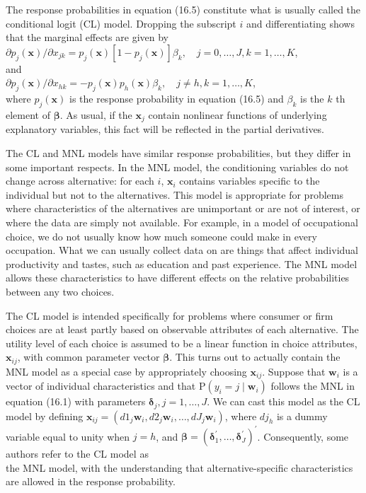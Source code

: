 \documentclass[10pt]{article}
\begin{document}
The response probabilities in equation (16.5) constitute what is usually called the conditional logit (CL) model. Dropping the subscript $i$ and differentiating shows that the marginal effects are given by\\
$\partial p_{j}(\mathbf{x}) / \partial x_{j k}=p_{j}(\mathbf{x})\left[1-p_{j}(\mathbf{x})\right] \beta_{k}, \quad j=0, \ldots, J, k=1, \ldots, K$,\\
and\\
$\partial p_{j}(\mathbf{x}) / \partial x_{h k}=-p_{j}(\mathbf{x}) p_{h}(\mathbf{x}) \beta_{k}, \quad j \neq h, k=1, \ldots, K$,\\
where $p_{j}(\mathbf{x})$ is the response probability in equation (16.5) and $\beta_{k}$ is the $k$ th element of $\boldsymbol{\beta}$. As usual, if the $\mathbf{x}_{j}$ contain nonlinear functions of underlying explanatory variables, this fact will be reflected in the partial derivatives.

The CL and MNL models have similar response probabilities, but they differ in some important respects. In the MNL model, the conditioning variables do not change across alternative: for each $i$, $\mathbf{x}_{i}$ contains variables specific to the individual but not to the alternatives. This model is appropriate for problems where characteristics of the alternatives are unimportant or are not of interest, or where the data are simply not available. For example, in a model of occupational choice, we do not usually know how much someone could make in every occupation. What we can usually collect data on are things that affect individual productivity and tastes, such as education and past experience. The MNL model allows these characteristics to have different effects on the relative probabilities between any two choices.

The CL model is intended specifically for problems where consumer or firm choices are at least partly based on observable attributes of each alternative. The utility level of each choice is assumed to be a linear function in choice attributes, $\mathbf{x}_{i j}$, with common parameter vector $\boldsymbol{\beta}$. This turns out to actually contain the MNL model as a special case by appropriately choosing $\mathbf{x}_{i j}$. Suppose that $\mathbf{w}_{i}$ is a vector of individual characteristics and that $\mathrm{P}\left(y_{i}=j \mid \mathbf{w}_{i}\right)$ follows the MNL in equation (16.1) with parameters $\boldsymbol{\delta}_{j}, j=1, \ldots, J$. We can cast this model as the CL model by defining $\mathbf{x}_{i j}=\left(d 1_{j} \mathbf{w}_{i}, d 2_{j} \mathbf{w}_{i}, \ldots, d J_{j} \mathbf{w}_{i}\right)$, where $d j_{h}$ is a dummy variable equal to unity when $j=h$, and $\boldsymbol{\beta}=\left(\boldsymbol{\delta}_{1}^{\prime}, \ldots, \boldsymbol{\delta}_{J}^{\prime}\right)^{\prime}$. Consequently, some authors refer to the CL model as\\
the MNL model, with the understanding that alternative-specific characteristics are allowed in the response probability.
\end{document}

